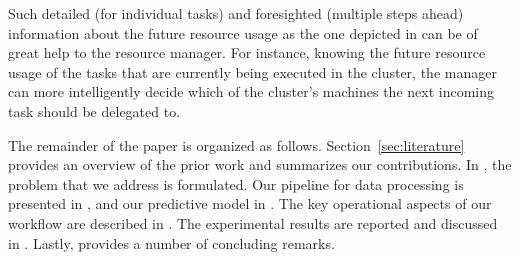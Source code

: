 Such detailed (for individual tasks) and foresighted (multiple steps ahead)
information about the future resource usage as the one depicted in
 can be of great help to the resource manager. For instance,
knowing the future resource usage of the tasks that are currently being executed
in the cluster, the manager can more intelligently decide which of the cluster's
machines the next incoming task should be delegated to.

The remainder of the paper is organized as follows. Section~\ref{sec:literature}
provides an overview of the prior work and summarizes our contributions. In
, the problem that we address is formulated. Our pipeline for data
processing is presented in , and our predictive model in
. The key operational aspects of our workflow are described in
. The experimental results are reported and discussed in
. Lastly,  provides a number of concluding
remarks.
